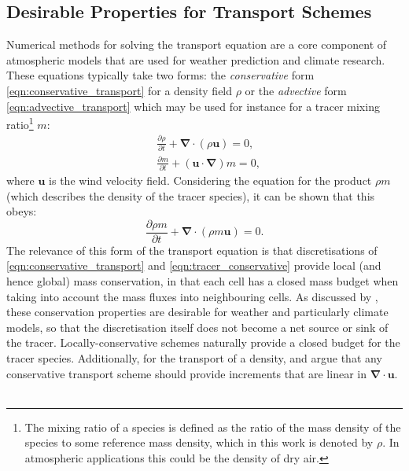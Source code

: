 \documentclass[11pt,a4paper]{article}
\newcommand{\pfrac}[2]{\frac{\partial{#1}}{\partial{#2}}}
\begin{document}
\subsection{Desirable Properties for Transport Schemes}
Numerical methods for solving the transport equation are a core component of atmospheric models that are used for weather prediction and climate research.
These equations typically take two forms: the \textit{conservative} form \eqref{eqn:conservative_transport} for a density field $\rho$ or the \textit{advective} form \eqref{eqn:advective_transport} which may be used for instance for a tracer mixing ratio\footnote{The mixing ratio of a species is defined as the ratio of the mass density of the species to some reference mass density, which in this work is denoted by $\rho$. In atmospheric applications this could be the density of dry air.} $m$:
\begin{subequations}
\begin{align}
& \pfrac{\rho}{t} + \bm{\nabla\cdot}\left(\rho\bm{u}\right) = 0, \label{eqn:conservative_transport} \\
& \pfrac{m}{t} + \left(\bm{u\cdot\nabla}\right)m = 0, \label{eqn:advective_transport}
\end{align}
\end{subequations}
where $\bm{u}$ is the wind velocity field.
Considering the equation for the product $\rho m$ (which describes the density of the tracer species), it can be shown that this obeys:
\begin{equation}
\pfrac{\rho m}{t} + \bm{\nabla\cdot}\left(\rho m\bm{u}\right) = 0. \label{eqn:tracer_conservative}
\end{equation}
The relevance of this form of the transport equation is that discretisations of \eqref{eqn:conservative_transport} and \eqref{eqn:tracer_conservative} provide local (and hence global) mass conservation, in that each cell has a closed mass budget when taking into account the mass fluxes into neighbouring cells.
As discussed by \cite{thuburn2008some}, these conservation properties are desirable for weather and particularly climate models, so that the discretisation itself does not become a net source or sink of the tracer.
Locally-conservative schemes naturally provide a closed budget for the tracer species. 
Additionally, for the transport of a density, \citet{lin1996ffsl} and \citet{melvin2024mixed} argue that any conservative transport scheme should provide increments that are linear in $\bm{\nabla\cdot u}$. 
\\
\\
\end{document}
